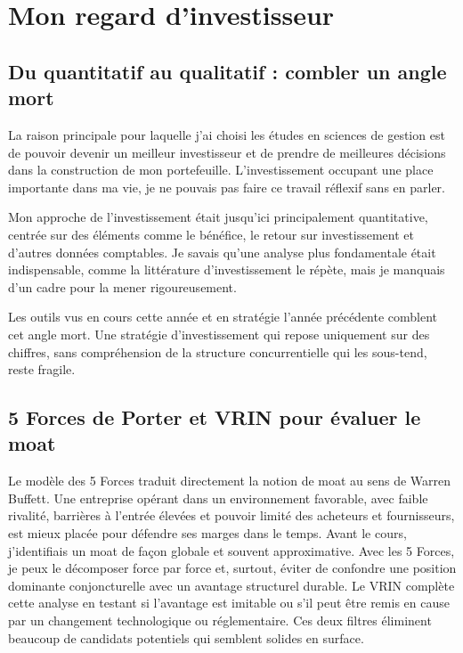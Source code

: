 \documentclass[12pt, a4paper]{article}
\begin{document}
\section{Mon regard d'investisseur}

\subsection{Du quantitatif au qualitatif : combler un angle mort}

La raison principale pour laquelle j'ai choisi les études en 
sciences de gestion est de pouvoir devenir un meilleur investisseur 
et de prendre de meilleures décisions dans la construction 
de mon portefeuille. L'investissement occupant une place 
importante dans ma vie, je ne pouvais pas faire ce travail 
réflexif sans en parler.

Mon approche de l'investissement était jusqu'ici 
principalement quantitative, centrée sur des éléments 
comme le bénéfice, le retour sur investissement et d'autres 
données comptables. Je savais qu'une analyse plus fondamentale 
était indispensable, comme la littérature d'investissement 
le répète, mais je manquais d'un cadre pour la mener 
rigoureusement. 

Les outils vus en cours cette année et en stratégie 
l'année précédente comblent cet angle mort. Une stratégie d'investissement
qui repose uniquement sur des chiffres, 
sans compréhension de la structure 
concurrentielle qui les sous-tend, reste fragile.

\subsection{5 Forces de Porter et VRIN pour évaluer le moat}

Le modèle des 5 Forces traduit directement la notion de moat 
au sens de Warren Buffett. Une entreprise opérant dans un environnement 
favorable, avec faible rivalité, barrières à l'entrée élevées 
et pouvoir limité des acheteurs et fournisseurs, est mieux 
placée pour défendre ses marges dans le temps. Avant le cours, 
j'identifiais un moat de façon globale et souvent approximative. 
Avec les 5 Forces, je peux le décomposer force par force et, 
surtout, éviter de confondre une position dominante 
conjoncturelle avec un avantage structurel durable. Le VRIN 
complète cette analyse en testant si l'avantage est imitable 
ou s'il peut être remis en cause par un changement technologique 
ou réglementaire. Ces deux filtres éliminent beaucoup de candidats potentiels 
qui semblent solides en surface.
\end{document}
